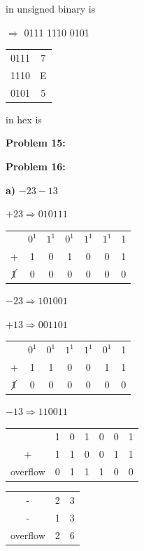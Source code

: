 \documentclass{article}
\begin{document}
    \quad{} in unsigned binary is 

    \quad{} $\Rightarrow$ 0111 1110 0101

    \begin{center}
        \begin{tabular}{ c|c }
            0111 & 7 \\
            1110 & E \\
            0101 & 5 
        \end{tabular}
    \end{center}

    \quad{} in hex is 

    \textbf{Problem 15:}



    \textbf{Problem 16:}

    \quad\textbf{a)} $-23 - 13$

    \quad\quad $+23 \Rightarrow 010111$

    \begin{center}
        \begin{tabular}{ ccccccc }
            & $0^1$ & $1^1$ & $0^1$ & $1^1$ & $1^1$ & 1 \\
            + & 1   & 0   & 1   & 0 & 0   & 1 \\
            \hline
            $\cancel{1}$& 0 & 0 & 0 & 0 & 0 & 0
        \end{tabular}
    \end{center}

    \quad\quad $-23 \Rightarrow 101001$

    \quad\quad $+13 \Rightarrow 001101$

    \begin{center}
        \begin{tabular}{ ccccccc }
            & $0^1$ & $0^1$ & $1^1$ & $1^1$ & $0^1$ & 1 \\
            + & 1   & 1   & 0   & 0 & 1   & 1 \\
            \hline
            $\cancel{1}$& 0 & 0 & 0 & 0 & 0 & 0
        \end{tabular}
    \end{center}

    \quad\quad $-13 \Rightarrow 110011$

    \begin{center}
        \begin{tabular}{ ccccccc }
              & 1 & 0 & 1 & 0 & 0 & 1 \\
            + & 1 & 1 & 0 & 0 & 1 & 1  \\
            \hline
            overflow & 0 & 1 & 1 & 1 & 0 & 0
        \end{tabular}
        \quad\quad 
        \begin{tabular}{ ccc }
            - & 2 & 3 \\
            - & 1 & 3 \\
            \hline
            overflow & 2 & 6
        \end{tabular}
    \end{center}
\end{document}
